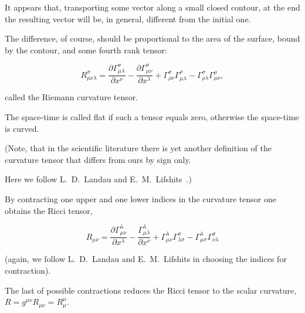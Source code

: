 It appears that, transporting some vector along a small closed contour, at the end the resulting vector will be, in general, different from the initial one. 

The difference, of course, should be proportional to the area of the surface, bound by the contour, and some fourth rank tensor:

\begin{equation}

\label{ctr}

R^{\sigma}_{\mu \nu \lambda} = \frac{\partial \Gamma^{\sigma}_{\mu \lambda}}{\partial x^{\nu}} -

\frac{\partial \Gamma^{\sigma}_{\mu \nu}}{\partial x^{\lambda}} +

\Gamma^{\sigma}_{\rho \nu} \Gamma^{\rho}_{\mu \lambda} -

\Gamma^{\sigma}_{\rho \lambda} \Gamma^{\rho}_{\mu \nu} ,

\end{equation}

called the Riemann curvature tensor. 

The space-time is called flat if such a tensor equals zero, otherwise the space-time is curved. 

(Note, that in the scientific literature there is yet another definition of the curvature tensor that differs from ours by sign only. 

Here we follow L.~D.~Landau and E.~M.~Lifshits~\cite{berez:LL2}.) 

By contracting one upper and one lower indices in the curvature tensor one obtains the Ricci tensor,

\begin{equation}

\label{tricci}

R_{\mu \nu} = \frac{\partial \Gamma^{\lambda}_{\mu \nu}}{\partial x^{\lambda}} -

\frac{\Gamma^{\lambda}_{\mu \lambda}}{\partial x^{\nu}} +

\Gamma^{\lambda}_{\mu \nu} \Gamma^{\sigma}_{\lambda \sigma} -

\Gamma^{\lambda}_{\mu \sigma} \Gamma^{\sigma}_{\nu \lambda}

\end{equation}

(again, we follow  L.~D.~Landau and E.~M.~Lifshits in choosing the indices for contraction).

The last of possible contractions reduces the Ricci tensor to the scalar curvature, $R = g^{\mu \nu} R_{\mu \nu} = R^{\mu}_{\mu}$. 

